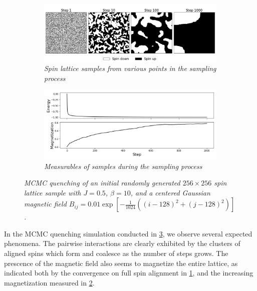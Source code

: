 \documentclass{article}
\begin{document}
\begin{figure}
    \begin{subfigure}{\textwidth}
        \includegraphics[width=\textwidth]{report_mcmc_gaussian}
        \centering
        \caption{\textit{Spin lattice samples from various points in the sampling process}}
        \label{fig:mcmc_gaussian_a}
    \end{subfigure}
    \begin{subfigure}{\textwidth}
        \includegraphics[width=\textwidth]{report_mcmc_gaussian_measurables}
        \centering
        \caption{\textit{Measurables of samples during the sampling process}}
        \label{fig:mcmc_gaussian_b}
    \end{subfigure}
    \centering
    \caption{\textit{
        MCMC quenching of an initial randomly generated $256 \times 256$ spin 
        lattice sample with $J = 0.5$, $\beta = 10$, and a centered Gaussian 
        magnetic field
        $B_{ij} = 0.01 \exp [-\frac{1}{1024}((i-128)^2 + (j-128)^2)]$. 
    }}
    \label{fig:mcmc_gaussian}
\end{figure}

In the MCMC quenching simulation conducted in \ref{fig:mcmc_gaussian}, we 
observe several expected phenomena. 
The pairwise interactions are clearly exhibited by the clusters of aligned spins 
which form and coalesce as the number of steps grows. 
The prescence of the magnetic field also seems to magnetize the entire lattice, 
as indicated both by the convergence on full spin alignment in 
\ref{fig:mcmc_gaussian_a}, and the increasing magnetization measured in 
\ref{fig:mcmc_gaussian_b}. 
\end{document}
